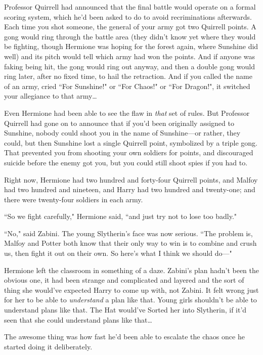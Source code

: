 Professor Quirrell had announced that the final battle would operate on a formal scoring system, which he'd been asked to do to avoid recriminations afterwards. Each time you shot someone, the general of your army got two Quirrell points. A gong would ring through the battle area (they didn't know yet where they would be fighting, though Hermione was hoping for the forest again, where Sunshine did well) and its pitch would tell which army had won the points. And if anyone was faking being hit, the gong would ring out anyway, and then a double gong would ring later, after no fixed time, to hail the retraction. And if you called the name of an army, cried ``For Sunshine!" or ``For Chaos!" or ``For Dragon!", it switched your allegiance to that army{\ldots}

Even Hermione had been able to see the flaw in \emph{that} set of rules. But Professor Quirrell had gone on to announce that if you'd been originally assigned to Sunshine, nobody could shoot you in the name of Sunshine—or rather, they could, but then Sunshine lost a single Quirrell point, symbolized by a triple gong. That prevented you from shooting your own soldiers for points, and discouraged suicide before the enemy got you, but you could still shoot spies if you had to.

Right now, Hermione had two hundred and forty-four Quirrell points, and Malfoy had two hundred and nineteen, and Harry had two hundred and twenty-one; and there were twenty-four soldiers in each army.

``So we fight carefully," Hermione said, ``and just try not to lose too badly."

``No," said Zabini. The young Slytherin's face was now serious. ``The problem is, Malfoy and Potter both know that their only way to win is to combine and crush us, then fight it out on their own. So here's what I think we should do—"

Hermione left the classroom in something of a daze. Zabini's plan hadn't been the obvious one, it had been strange and complicated and layered and the sort of thing she would've expected Harry to come up with, not Zabini. It felt wrong just for her to be able to \emph{understand} a plan like that. Young girls shouldn't be able to understand plans like that. The Hat would've Sorted her into Slytherin, if it'd seen that she could understand plans like that{\ldots}

\later

The awesome thing was how fast he'd been able to escalate the chaos once he started doing it deliberately.

